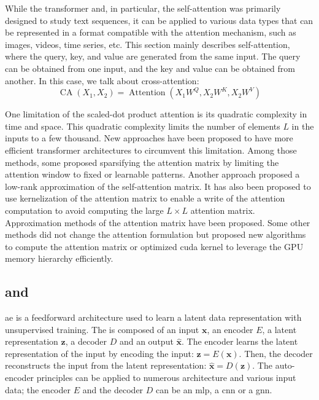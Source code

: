 \documentclass[../main.tex]{subfiles}
\begin{document}
	 While the transformer and, in particular, the self-attention was primarily designed to study text sequences, it can be applied to various data types that can be represented in a format compatible with the attention mechanism, such as images, videos, time series, etc.
	 This section mainly describes self-attention, where the query, key, and value are generated from the same input.
	 The query can be obtained from one input, and the key and value can be obtained from another.
	 In this case, we talk about cross-attention:
	 \begin{equation}
		\operatorname{CA}\left(X_1, X_2 \right) = \operatorname{Attention} \left(X_1W^Q, X_2W^K, X_2W^V\right) \label{eq:cross_attention}
	 \end{equation}

	 One limitation of the scaled-dot product attention is its quadratic complexity in time and space.
	 This quadratic complexity limits the number of elements \(L\) in the inputs to a few thousand.
	 New approaches have been proposed to have more efficient transformer architectures to circumvent this limitation.
	 Among those methods, some proposed sparsifying the attention matrix by limiting the attention window to fixed or learnable patterns.
	 Another approach proposed a low-rank approximation of the self-attention matrix.
	 It has also been proposed to use kernelization of the attention matrix to enable a write of the attention computation to avoid computing the large \(L \times L\) attention matrix.
	 Approximation methods of the attention matrix have been proposed.
	 Some other methods did not change the attention formulation but proposed new algorithms to compute the attention matrix or optimized cuda kernel to leverage the GPU memory hierarchy efficiently.

 \subsection{ and }
	 \Gls{ae} is a feedforward architecture used to learn a latent data representation with unsupervised training.
	 The  is composed of an input \(\symbf{x}\), an encoder \(E\), a latent representation \(\symbf{z}\), a decoder \(D\) and an output \(\symbf{\hat{x}}\).
	 The encoder learns the latent representation of the input by encoding the input: \(\symbf{z} = E\left(\symbf{x}\right)\).
	 Then, the decoder reconstructs the input from the latent representation: \(\symbf{\hat{x}} = D\left(\symbf{z}\right)\).
	 The auto-encoder principles can be applied to numerous architecture and various input data; the encoder \(E\) and the decoder \(D\) can be an \gls{mlp}, a \gls{cnn} or a \gls{gnn}.
\end{document}

